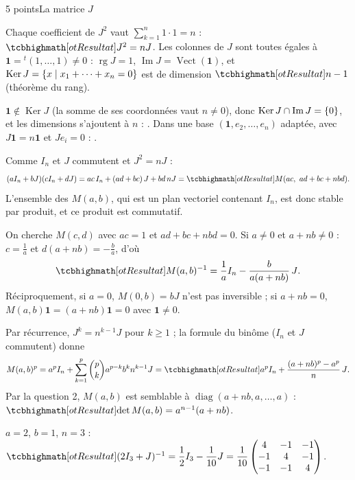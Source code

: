 

\begin{corrigeEval}{5 points}{La matrice $J$}
\begin{questions}
  \item Chaque coefficient de $J^{2}$ vaut $\sum_{k=1}^{n}1\cdot1=n$ :
    $\res{J^{2}=nJ}$. Les colonnes de $J$ sont toutes égales à
    $\mathbf{1}={}^{t}(1,\dots,1)\neq0$ : $\operatorname{rg}J=1$,
    $\operatorname{Im}J=\operatorname{Vect}(\mathbf{1})$, et
    $\operatorname{Ker}J=\left\{x\mid x_1+\dots+x_n=0\right\}$ est de dimension
    $\res{n-1}$ (théorème du rang). \pts{1 pt}
  \item $\mathbf{1}\notin\operatorname{Ker}J$ (la somme de ses coordonnées
    vaut $n\neq0$), donc $\operatorname{Ker}J\cap\operatorname{Im}J=\left\{0\right\}$,
    et les dimensions s'ajoutent à $n$ : .
    Dans une base $(\mathbf{1},e_2,\dots,e_n)$ adaptée, avec $J\mathbf{1}=n\mathbf{1}$ et
    $Je_i=0$ : .
    \pts{1 pt}
  \item Comme $I_n$ et $J$ commutent et $J^{2}=nJ$ :
    \[(aI_n+bJ)(cI_n+dJ)=ac\,I_n+(ad+bc)\,J+bd\,nJ=\res{M(ac,\ ad+bc+nbd)}.\]
    L'ensemble des $M(a,b)$, qui est un plan vectoriel contenant $I_n$, est
    donc stable par produit, et ce produit est commutatif. 
  \item On cherche $M(c,d)$ avec $ac=1$ et $ad+bc+nbd=0$. Si $a\neq0$ et
    $a+nb\neq0$ : $c=\frac1a$ et $d(a+nb)=-\frac ba$, d'où
    \[\res{M(a,b)^{-1}=\frac1aI_n-\frac{b}{a(a+nb)}\,J}.\]
    Réciproquement, si $a=0$, $M(0,b)=bJ$ n'est pas inversible ; si
    $a+nb=0$, $M(a,b)\mathbf{1}=(a+nb)\mathbf{1}=0$ avec $\mathbf{1}\neq0$. \pts{1 pt}
  \item Par récurrence, $J^{k}=n^{k-1}J$ pour $k\geqslant1$ ; la formule du
    binôme ($I_n$ et $J$ commutent) donne
    \[M(a,b)^{p}=a^{p}I_n+\sum_{k=1}^{p}\binom pk a^{p-k}b^{k}n^{k-1}J
      =\res{a^{p}I_n+\frac{(a+nb)^{p}-a^{p}}{n}\,J}.\]
    Par la question 2, $M(a,b)$ est semblable à
    $\operatorname{diag}(a+nb,a,\dots,a)$ :
    $\res{\det M(a,b)=a^{n-1}(a+nb)}$. \pts{1 pt}
  \item $a=2$, $b=1$, $n=3$ :
    $\res{(2I_3+J)^{-1}=\dfrac12I_3-\dfrac{1}{10}J}
    =\dfrac{1}{10}\begin{pmatrix}4&-1&-1\\-1&4&-1\\-1&-1&4\end{pmatrix}$.
\end{questions}
\end{corrigeEval}

